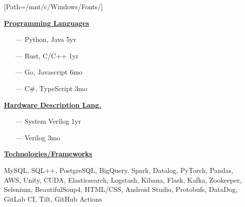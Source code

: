 \documentclass{WeiAndrew}
\begin{document}
[Path=/mnt/c/Windows/Fonts/]
\setlength{\topskip}{0pt}
\noindent{}%
{%
    \hspace{0.02\textwidth}
    \begin{minipage}[t][\textheight-2\fboxsep-2\fboxrule][t]{0.25\textwidth}
        \color{white}
        \vspace{12px}
        \vspace{12px}
        \vspace{12px}

        \begin{itemize}[align=center, leftmargin=7.5mm]
        \end{itemize}
        \vspace{12px}

        \textbf{\underline{Programming Languages}}
        \begin{itemize}[leftmargin=4mm, rightmargin=20px]
            \item[---] Python, Java    \hfill 5yr
            \item[---] Rust, C/C++     \hfill 1yr
            \item[---] Go, Javascript  \hfill 6mo
            \item[---] C\#, TypeScript \hfill 3mo
        \end{itemize}
        \vspace{12px}

        \noindent\textbf{\underline{Hardware Description Lang.}}
        \begin{itemize}[leftmargin=4mm, rightmargin=20px]
            \item[---] System Verilog \hfill 1yr
            \item[---] Verilog        \hfill 3mo
        \end{itemize}
        \vspace{12px}

        \textbf{\underline{Technologies/Frameworks}}
        \raggedright MySQL, SQL++, PostgreSQL, BigQuery,
        Spark, Datalog, PyTorch,
        Pandas, AWS, Unity, CUDA,
        Elasticsearch, Logstash,
        Kibana, Flask, Kafka,
        Zookeeper, Selenium,
        BeautifulSoup4, HTML/CSS,
        Android Studio, Protobufs,
        DataDog, GitLab CI, Tilt, GitHub Actions
        \vspace{12px}


\end{minipage}}
\end{document}
